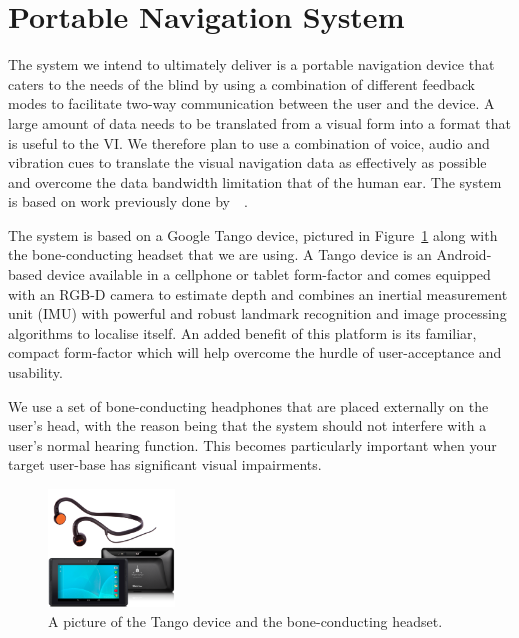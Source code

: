 \documentclass[format=sigconf, review=true, screen=true, anonymous=true]{acmart}
\begin{document}

\section{Portable Navigation System}
\label{sec:portable-navigation}

The system we intend to ultimately deliver is a portable navigation device that caters to the needs of the blind by using a combination of different feedback modes to facilitate two-way communication between the user and the device. A large amount of data needs to be translated from a visual form into a format that is useful to the VI. We therefore plan to use a combination of voice, audio and vibration cues to translate the visual navigation data as effectively as possible and overcome the data bandwidth limitation that of the human ear. The system is based on work previously done by~\citeauthor{bellotto2013}~\cite{bellotto2013}. 

The system is based on a Google Tango device, pictured in Figure~\ref{fig:tango} along with the bone-conducting headset that we are using. A Tango device is an Android-based device available in a cellphone or tablet form-factor and comes equipped with an RGB-D camera to estimate depth and combines an inertial measurement unit (IMU) with powerful and robust landmark recognition and image processing algorithms to localise itself. An added benefit of this platform is its familiar, compact form-factor which will help overcome the hurdle of user-acceptance and usability. %

We use a set of bone-conducting headphones that are placed externally on the user's head, with the reason being that the system should not interfere with a user's normal hearing function. This becomes particularly important when your target user-base has significant visual impairments. 

\begin{figure}
  \centering
  \includegraphics[width=0.3\textwidth]{figures/tango_headphone.png}
  \caption{A picture of the Tango device and the bone-conducting headset.}
  \label{fig:tango}
\end{figure}
\end{document}
